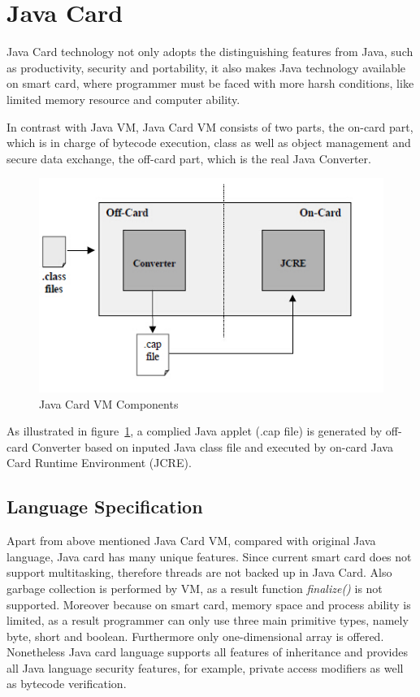 \section{Java Card}
Java Card technology not only adopts the distinguishing features from Java, such as productivity, security and portability\cite{jcadg}, it also makes Java technology available on smart card, where programmer must be faced with more harsh conditions, like limited memory resource and computer ability.

In contrast with Java VM, Java Card VM consists of two parts, the on-card part, which is in charge of bytecode execution, class as well as object management and secure data exchange, the off-card part, which is the real Java Converter.
 \begin{figure}[!htbp]
	\centering
	\includegraphics[width=1\textwidth]{jcvm.jpg}
		\caption{Java Card VM Components\cite{jcadg}}
	\label{fig:jcvm}
\end{figure}
As illustrated in figure~\ref{fig:jcvm}, a complied Java applet (.cap file) is generated by off-card Converter based on inputed Java class file and executed by on-card Java Card Runtime Environment (JCRE). 

\subsection{Language Specification}
Apart from above mentioned Java Card VM, compared with original Java language, Java card has many unique features.
Since current smart card does not support multitasking, therefore threads are not backed up in Java Card. Also garbage collection  is performed by VM, as a result function \emph{finalize()} is not supported. Moreover because on smart card, memory space and process ability is limited, as a result programmer can only use three main primitive types, namely byte, short and boolean. Furthermore only one-dimensional array is offered. Nonetheless Java card language supports all features of inheritance and provides all Java language security features, for example, private access modifiers as well as bytecode verification\cite{jcadg}.

